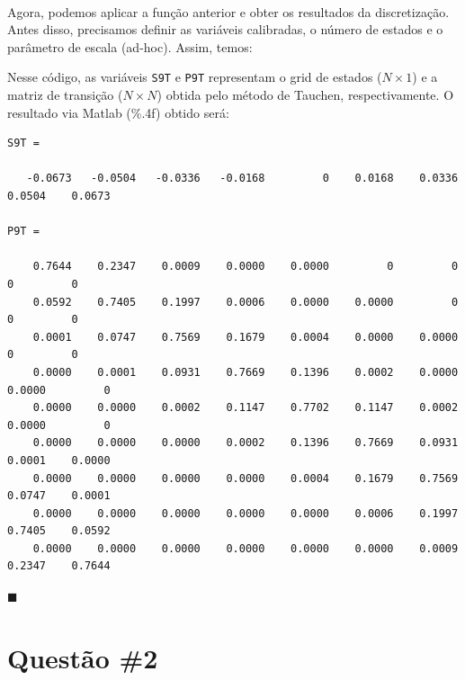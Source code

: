\documentclass[10pt]{article}
\newcommand*{\QEDA}{\hfill\ensuremath{\blacksquare}}%
\newcommand\0{\mathbf{0}}
\newenvironment{sol}
    {\\[1em] {\color{magenta}\text{Resposta.}}
    }
    {{\color{blue!50!black}\QEDA}}
\begin{document}
\begin{sol}


Agora, podemos aplicar a função anterior e obter os resultados da discretização. Antes disso, precisamos definir as variáveis calibradas, o número de estados e o parâmetro de escala (ad-hoc). Assim, temos:
\newpage

Nesse código, as variáveis \verb|S9T| e \verb|P9T| representam o grid de estados ($N \times 1$) e a matriz de transição ($N\times N$) obtida pelo método de Tauchen, respectivamente. O resultado via Matlab (\%.4f) obtido será:
\begin{lstlisting}
S9T =

   -0.0673   -0.0504   -0.0336   -0.0168         0    0.0168    0.0336    0.0504    0.0673

P9T =

    0.7644    0.2347    0.0009    0.0000    0.0000         0         0         0         0
    0.0592    0.7405    0.1997    0.0006    0.0000    0.0000         0         0         0
    0.0001    0.0747    0.7569    0.1679    0.0004    0.0000    0.0000         0         0
    0.0000    0.0001    0.0931    0.7669    0.1396    0.0002    0.0000    0.0000         0
    0.0000    0.0000    0.0002    0.1147    0.7702    0.1147    0.0002    0.0000         0
    0.0000    0.0000    0.0000    0.0002    0.1396    0.7669    0.0931    0.0001    0.0000
    0.0000    0.0000    0.0000    0.0000    0.0004    0.1679    0.7569    0.0747    0.0001
    0.0000    0.0000    0.0000    0.0000    0.0000    0.0006    0.1997    0.7405    0.0592
    0.0000    0.0000    0.0000    0.0000    0.0000    0.0000    0.0009    0.2347    0.7644
\end{lstlisting}
\end{sol}


\section*{Questão \#2}
\end{document}
